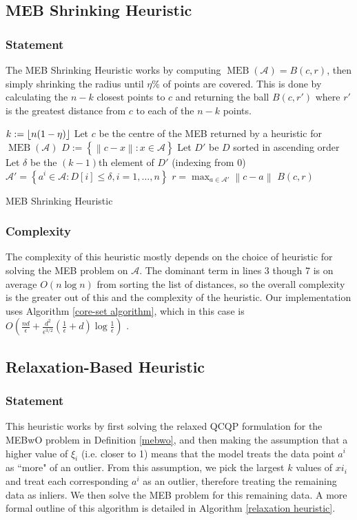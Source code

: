 \documentclass[11pt,twoside]{report}
\newcommand{\A}{\mathcal{A}} %
\newcommand{\norm}[1]{\left\lVert#1\right\rVert} %
\DeclareMathOperator{\MEB}{MEB}
\DeclarePairedDelimiter\floor{\lfloor}{\rfloor}
\theoremstyle{definition}
\numberwithin{theorem}{section}
\numberwithin{definition}{section}
\numberwithin{lemma}{section}
\numberwithin{proposition}{section}
\numberwithin{equation}{section}
\numberwithin{figure}{section}
\begin{document}
\subsection{MEB Shrinking Heuristic}
\subsubsection{Statement}
The MEB Shrinking Heuristic works by computing $\MEB(\A) = B(c,r)$, then simply shrinking the radius until $\eta\%$ of points are covered. This is done by calculating the $n-k$ closest points to $c$ and returning the ball $B(c,r')$ where $r'$ is the greatest distance from $c$ to each of the $n-k$ points.

\begin{algorithm}[H]\label{meb shrink}
    \SetAlgoLined
    \KwIn{Data set $\A$, $\eta\in[0,1]$, $\epsilon>0$}
    $k:=\floor{n(1-\eta)}$\;
    Let $c$ be the centre of the MEB returned by a heuristic for $\MEB(\A)$\;
    $D:=\left\{\norm{c-x}: x\in\A\right\}$\;
    Let $D'$ be $D$ sorted in ascending order\;
    Let $\delta$ be the $(k-1)$th element of $D'$ (indexing from 0)\;
    $\A' = \left\{a^i\in\A: D[i] \leq \delta, i=1,\ldots,n\right\}$\;
    $r = \max_{a\in\A'}\norm{c-a}$\;
    \KwRet $B(c,r)$\;
    
    \caption{MEB Shrinking Heuristic}
\end{algorithm}

\subsubsection{Complexity}
The complexity of this heuristic mostly depends on the choice of heuristic for solving the MEB problem on $\A$. The dominant term in lines 3 though 7 is on average $O(n\log n)$ from sorting the list of distances, so the overall complexity is the greater out of this and the complexity of the heuristic. Our implementation uses Algorithm \ref{core-set algorithm}, which in this case is $O\left(\frac{nd}{\epsilon}+\frac{d^2}{\epsilon^{3/2}}\left(\frac{1}{\epsilon}+d\right)\log\frac{1}{\epsilon}\right)$ \cite[Page 6]{core-sets}.


\subsection{Relaxation-Based Heuristic}
\subsubsection{Statement}
This heuristic works by first solving the relaxed QCQP formulation for the MEBwO problem in Definition \ref{mebwo}, and then making the assumption that a higher value of $\xi_i$ (i.e. closer to 1) means that the model treats the data point $a^i$ as ``more" of an outlier. From this assumption, we pick the largest $k$ values of $xi_i$ and treat each corresponding $a^i$ as an outlier, therefore treating the remaining data as inliers. We then solve the MEB problem for this remaining data. A more formal outline of this algorithm is detailed in Algorithm \ref{relaxation heuristic}.
\end{document}
